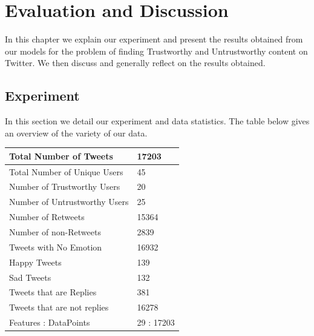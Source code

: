 \chapter{Evaluation and Discussion}

In this chapter we explain our experiment and present the results obtained from our models for the problem of finding Trustworthy and Untrustworthy content on Twitter. We then discuss and generally reflect on the results obtained.

\section{Experiment}
In this section we detail our experiment and data statistics. The table below gives an overview of the variety of our data. 
\begin{center}
\begin{tabular}{|l|l|}
\hline
Total Number of Tweets  &  17203  \\ \hline
Total Number of Unique Users & 45  \\ \hline
Number of Trustworthy Users  & 20 \\ \hline
Number of Untrustworthy Users & 25  \\ \hline
Number of Retweets   & 15364  \\ \hline
Number of non-Retweets & 2839  \\ \hline
Tweets with No Emotion &  16932\\ \hline
Happy Tweets   & 139 \\ \hline
Sad Tweets    & 132 \\ \hline
Tweets that are Replies & 381 \\ \hline
Tweets that are not replies & 16278 \\ \hline
 Features : DataPoints & 29 : 17203  \\ \hline
\end{tabular}
\end{center}
